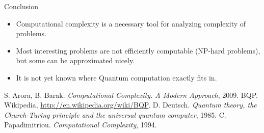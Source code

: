 \documentclass[c]{beamer}
\begin{document}
\begin{frame}{Conclusion}
	\begin{itemize}
		\item Computational complexity is a necessary tool for analyzing complexity of problems.
		\item Most interesting problems are not efficiently computable (NP-hard problems), but some can be approximated nicely.
		\item It is not yet known where Quantum computation exactly fits in.
	\end{itemize}
\end{frame}

\begin{thebibliography}{n}
	 S. Arora, B. Barak. \emph{Computational Complexity. A Modern 
Approach}, 2009.
	 BQP. Wikipedia, \url{http://en.wikipedia.org/wiki/BQP}.
	 D. Deutsch. \emph{Quantum theory, the Church-Turing principle and the universal quantum computer}, 1985.
	 C. Papadimitriou. \emph{Computational Complexity}, 1994.
\end{thebibliography}
\end{document}
